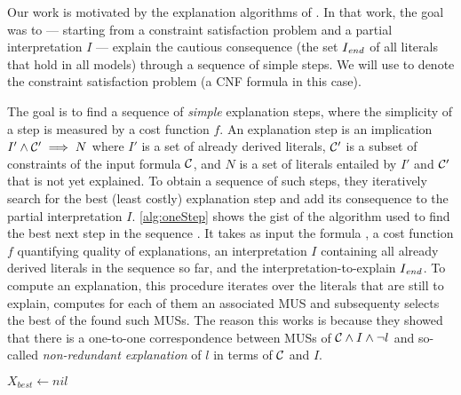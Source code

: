 Our work is motivated by the  explanation algorithms of \citet{ecai/BogaertsGCG20}. 
In that work, the goal was to --- starting from a constraint satisfaction problem and a partial interpretation $I$ --- explain the cautious consequence (the set $I_\mathit{end} $ of all literals that hold in all models) through a sequence of simple steps. 
We will use \formulac to denote the constraint satisfaction problem (a CNF formula in this case). %

The goal is to find a sequence of \textit{simple} explanation steps, where the simplicity of a step is measured by a cost function $f$. 
An explanation step is an implication $I' \wedge \mathcal{C} ' \implies N$ where $I'$ is a set of already derived literals, $\mathcal{C} '$ is a subset of constraints of the input formula $\mathcal{C} $, and $N$ is a set of literals entailed by $I'$ and $\mathcal{C} '$ that is not yet explained.
To obtain a sequence of such steps, they iteratively search for the best (least costly) explanation step and add its consequence to the partial interpretation $I$.
\cref{alg:oneStep} shows the gist of the algorithm used to find the best next step in the sequence \cite{ecai/BogaertsGCG20}.
It takes as input the formula \formulac, a cost function $f$ quantifying quality of explanations, an interpretation $I$ containing all already derived literals in the sequence so far, and the interpretation-to-explain $I_\mathit{end} $. 
To compute an explanation, this procedure iterates over the literals that are still to explain, computes for each of them an associated MUS and subsequenty selects the best of the found such MUSs.  
The reason this works is because they showed that there is a one-to-one correspondence between MUSs of $\mathcal{C}  \land I \land \neg l$ and so-called \emph{non-redundant explanation} of $l$ in terms of $\mathcal{C} $ and $I$. 


\newcommand\onestep{\ensuremath{\call{explain-One-Step}}\xspace}

\begin{algorithm}[t]
  \caption{$\onestep(\formulac,f,I,\Iend)$}
  \label{alg:oneStep}
$X_{best} \gets \mathit{nil}$\;
\end{algorithm}

